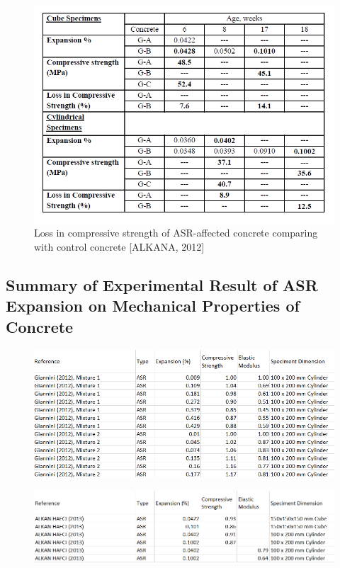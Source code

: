 \begin{figure}[h!]
  \centering
  \includegraphics[width=1.0\linewidth]{Reference/ALKANASR3.png}
  \caption{Loss in compressive strength of ASR-affected concrete comparing with control concrete [ALKANA, 2012]}
  \label{ALKANA3}
\end{figure}

\clearpage
\subsection{Summary of Experimental Result of ASR Expansion on Mechanical Properties of Concrete}

\begin{figure}[h!]
  \centering
  \includegraphics[width=1.0\linewidth]{Reference/GIANNINIASRdata.png}
\end{figure}

\begin{figure}[h!]
  \centering
  \includegraphics[width=1.0\linewidth]{Reference/ALKANASRdata.png}
\end{figure}

